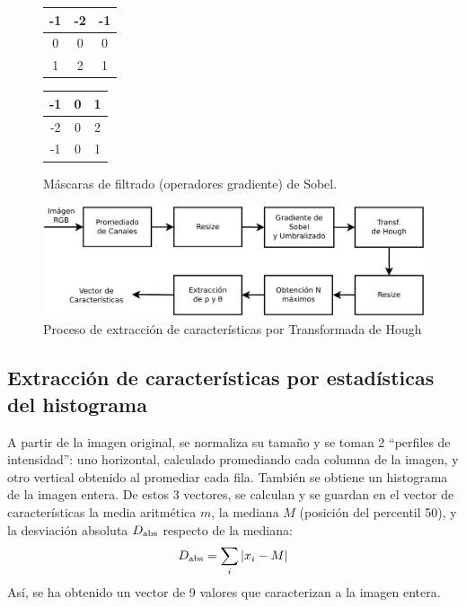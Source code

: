 \documentclass[conference,a4paper,10pt,oneside,final]{tfmpd}
\begin{document}
\begin{figure}
\begin{center}
\begin{tabular}{|c|c|c|}
\hline -1 & -2 & -1 \\\hline 0 & 0 & 0 \\\hline 1 & 2 & 1 \\\hline
\end{tabular}
\begin{tabular}{|c|c|c|}
\hline -1 & 0 & 1 \\\hline -2 & 0 & 2 \\\hline -1 & 0 & 1 \\\hline
\end{tabular}
\end{center}
\caption{Máscaras de filtrado (operadores gradiente) de Sobel.}
\label{masksobel}
\end{figure}
\begin{figure}
\begin{center}
\includegraphics[scale=0.25]{../diagramas/procesohough} 
\end{center}
\caption{Proceso de extracción de características por Transformada de Hough}
\label{procesohough}
\end{figure}
%
%
\subsection{Extracción de características por estadísticas del histograma}
A partir de la imagen original, se normaliza su tamaño y se toman 2 ``perfiles
de intensidad'': uno horizontal, calculado 
promediando %
cada columna de la
imagen, y otro vertical obtenido al promediar cada fila. También se obtiene un
histograma de la imagen entera. De estos 3 vectores, se calculan
y se guardan en el
vector de características la media aritmética $m$, la mediana $M$ (posición del
percentil 50),  y la desviación absoluta $D_{\textrm{abs}}$ respecto de la mediana:
\begin{equation*}
D_{\textrm{abs}}=\sum_i |x_i - M|
\end{equation*}
Así, se ha obtenido un vector de 9 valores que caracterizan%
a la imagen entera.
\end{document}

